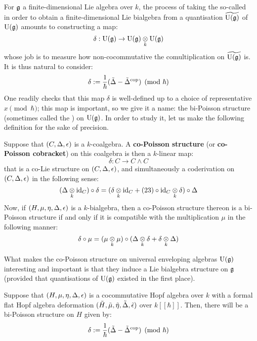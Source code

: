             For $\mathfrak{g}$ a finite-dimensional Lie algebra over $k$, the process of taking the so-called  in order to obtain a finite-dimensional Lie bialgebra from a quantisation $\widetilde{\mathrm{U}(\mathfrak{g})}$ of $\mathrm{U}(\mathfrak{g})$ amounts to constructing a  map:
                $$\delta: \rmU(\g) \to \rmU(\g) \tensor_k \rmU(\g)$$
            whose job is to measure how non-cocommutative the comultiplication on $\widetilde{\mathrm{U}(\mathfrak{g})}$ is. It is thus natural to consider:
                $$\delta := \frac1\hbar(\tilde{\Delta} - \tilde{\Delta}^{\mathrm{cop}}) \pmod{\hbar}$$
            One readily checks that this map $\delta$ is well-defined up to a choice of representative $x \pmod{\hbar}$; this map is important, so we give it a name: the bi-Poisson structure (sometimes called the ) on $\mathrm{U}(\mathfrak{g})$. In order to study it, let us make the following definition for the sake of precision.
            \begin{definition} \label{def: co/bi_poisson_structures}
                Suppose that $(C, \Delta, \epsilon)$ is a $k$-coalgebra. A \textbf{co-Poisson structure} (or \textbf{co-Poisson cobracket}) on this coalgebra is then a $k$-linear map:
                    $$\delta: C \to C \wedge C$$
                that is a co-Lie structure on $(C, \Delta, \epsilon)$, and simultaneously a coderivation on $(C, \Delta, \epsilon)$ in the following sense:
                    $$(\Delta \tensor_k \id_C) \circ \delta = (\delta \tensor_k \id_C + (23) \circ \id_C \tensor_k \delta) \circ \Delta$$
                Now, if $(H, \mu, \eta, \Delta, \epsilon)$ is a $k$-bialgebra, then a co-Poisson structure thereon is a bi-Poisson structure if and only if it is compatible with the multiplication $\mu$ in the following manner:
                    $$\delta \circ \mu = (\mu \tensor_k \mu) \circ (\Delta \tensor_k \delta + \delta \tensor_k \Delta)$$
            \end{definition}
            What makes the co-Poisson structure on universal enveloping algebras $\mathrm{U}(\mathfrak{g})$ interesting and important is that they induce a Lie bialgebra structure on $\mathfrak{g}$ (provided that quantisations of $\mathrm{U}(\mathfrak{g})$ existed in the first place). 
            \begin{lemma} \label{lemma: bi_poisson_structures_from_hopf_algebra_deformations}
                Suppose that $(H, \mu, \eta, \Delta, \epsilon)$ is a cocommutative Hopf algebra over $k$ with a formal flat Hopf algebra deformation $(\tilde{H}, \tilde{\mu}, \tilde{\eta}, \tilde{\Delta}, \tilde{\epsilon})$ over $k[\![\hbar]\!]$. Then, there will be a bi-Poisson structure on $H$ given by:
                    $$\delta := \frac{1}{\hbar}(\tilde{\Delta} - \tilde{\Delta}^{\mathrm{cop}}) \pmod{\hbar}$$
            \end{lemma}
